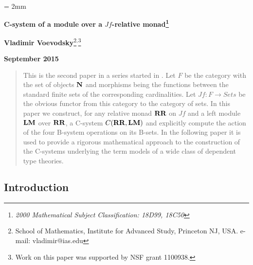 \documentclass[11pt]{article}
\newcommand{\sr}{\rightarrow}
\newcommand{\nn}{{\bf N\rm}}
\newcommand{\nat}{\nn}
\newcommand{\RR}{{\bf RR}}
\newcommand{\LM}{{\bf LM}}
\begin{document}
%
\parskip = 2mm
\begin{center}
{\bf\Large C-system of a module over a $Jf$-relative monad\footnote{\em 2000 Mathematical Subject Classification: 
%
18D99, %
18C50  %
%
}}


\vspace{3mm}

{\large\bf Vladimir Voevodsky}\footnote{School of Mathematics, Institute for Advanced Study,
Princeton NJ, USA. e-mail: vladimir@ias.edu}$^,$\footnote{Work on this paper was supported by NSF grant 1100938.}
\vspace {3mm}

{\large\bf September 2015}  
\end{center}

\begin{abstract}
This is the second paper in a series started in \cite{Csubsystems}. Let $F$ be the category with the set of objects $\nat$ and morphisms being the functions between the standard finite sets of the corresponding cardinalities. Let $Jf:F\sr Sets$ be the obvious functor from this category to the category of sets. In this paper we construct, for any relative monad $\RR$ on $Jf$ and a left module $\LM$ over $\RR$, a C-system $C(\RR,\LM)$ and explicitly compute the action of the four B-system operations on its B-sets. 
In the following paper it is used to provide a rigorous mathematical approach to the construction of the C-systems underlying the term models of a wide class of dependent type theories. 
\end{abstract}




\tableofcontents

\subsection{Introduction}
\end{document}
